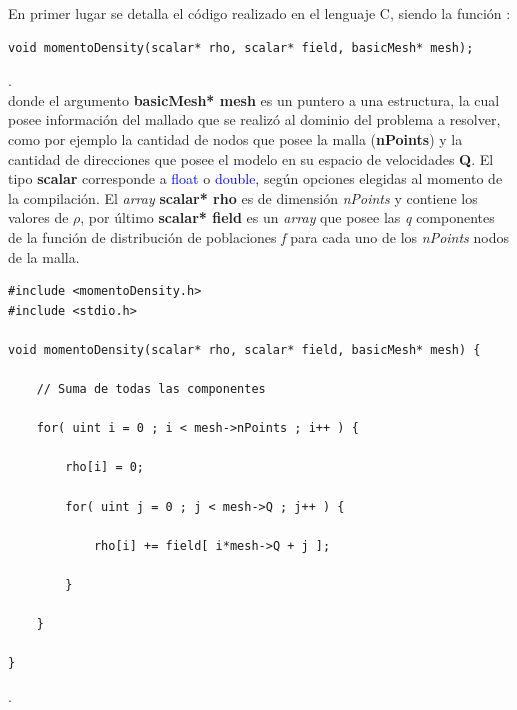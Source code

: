 En primer lugar se detalla el código realizado en el lenguaje \textsc{C}, siendo la función :

{\footnotesize
	\begin{frame}{}
		\begin{lstlisting}
void momentoDensity(scalar* rho, scalar* field, basicMesh* mesh);
		\end{lstlisting}
		
	\end{frame}
}.
\\
donde el argumento \textbf{basicMesh* mesh} es un puntero a una estructura, la cual posee información del mallado que se realizó al dominio del problema a resolver, como por ejemplo la cantidad de nodos que posee la malla (\textbf{nPoints}) y la cantidad de direcciones que posee el modelo en su espacio de velocidades \textbf{Q}. El tipo \textbf{scalar} corresponde a \textcolor{blue}{float} o \textcolor{blue}{double}, según opciones elegidas al momento de la compilación. El \textit{array}  \textbf{scalar* rho} es de dimensión \textit{nPoints} y contiene los valores de $\rho$, por último \textbf{scalar* field} es un \textit{array} que posee las \textit{q} componentes de la función de distribución de poblaciones \textit{f} para cada uno de los  \textit{nPoints} nodos de la malla.


{\footnotesize
	\begin{frame}{}
		\begin{lstlisting}[frame=single]
#include <momentoDensity.h>
#include <stdio.h>

void momentoDensity(scalar* rho, scalar* field, basicMesh* mesh) {
	
	// Suma de todas las componentes
	
	for( uint i = 0 ; i < mesh->nPoints ; i++ ) {
		
		rho[i] = 0;	    
		
		for( uint j = 0 ; j < mesh->Q ; j++ ) {
		
			rho[i] += field[ i*mesh->Q + j ];
		
		}	
			
	}
	
}
		\end{lstlisting}
		
	\end{frame}
}.
\\


